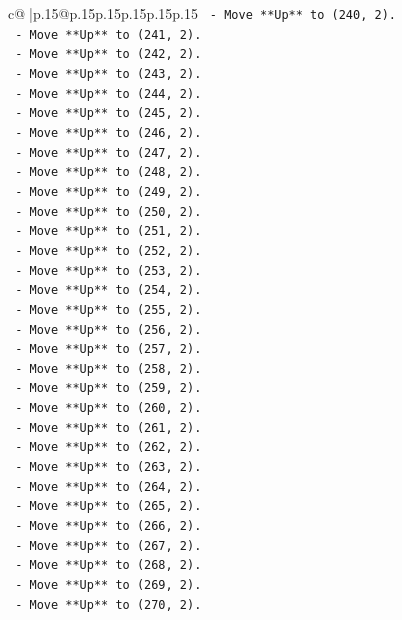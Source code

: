 \documentclass{article}
\begin{document}
{\begin{supertabular}{c@{$\;$}|p{.15\linewidth}@{}p{.15\linewidth}p{.15\linewidth}p{.15\linewidth}p{.15\linewidth}p{.15\linewidth}}
{{{\texttt{    {-} Move **Up** to (240, 2).} \\
\texttt{    {-} Move **Up** to (241, 2).} \\
\texttt{    {-} Move **Up** to (242, 2).} \\
\texttt{    {-} Move **Up** to (243, 2).} \\
\texttt{    {-} Move **Up** to (244, 2).} \\
\texttt{    {-} Move **Up** to (245, 2).} \\
\texttt{    {-} Move **Up** to (246, 2).} \\
\texttt{    {-} Move **Up** to (247, 2).} \\
\texttt{    {-} Move **Up** to (248, 2).} \\
\texttt{    {-} Move **Up** to (249, 2).} \\
\texttt{    {-} Move **Up** to (250, 2).} \\
\texttt{    {-} Move **Up** to (251, 2).} \\
\texttt{    {-} Move **Up** to (252, 2).} \\
\texttt{    {-} Move **Up** to (253, 2).} \\
\texttt{    {-} Move **Up** to (254, 2).} \\
\texttt{    {-} Move **Up** to (255, 2).} \\
\texttt{    {-} Move **Up** to (256, 2).} \\
\texttt{    {-} Move **Up** to (257, 2).} \\
\texttt{    {-} Move **Up** to (258, 2).} \\
\texttt{    {-} Move **Up** to (259, 2).} \\
\texttt{    {-} Move **Up** to (260, 2).} \\
\texttt{    {-} Move **Up** to (261, 2).} \\
\texttt{    {-} Move **Up** to (262, 2).} \\
\texttt{    {-} Move **Up** to (263, 2).} \\
\texttt{    {-} Move **Up** to (264, 2).} \\
\texttt{    {-} Move **Up** to (265, 2).} \\
\texttt{    {-} Move **Up** to (266, 2).} \\
\texttt{    {-} Move **Up** to (267, 2).} \\
\texttt{    {-} Move **Up** to (268, 2).} \\
\texttt{    {-} Move **Up** to (269, 2).} \\
\texttt{    {-} Move **Up** to (270, 2).} \\
}}}
\end{supertabular}}
\end{document}

